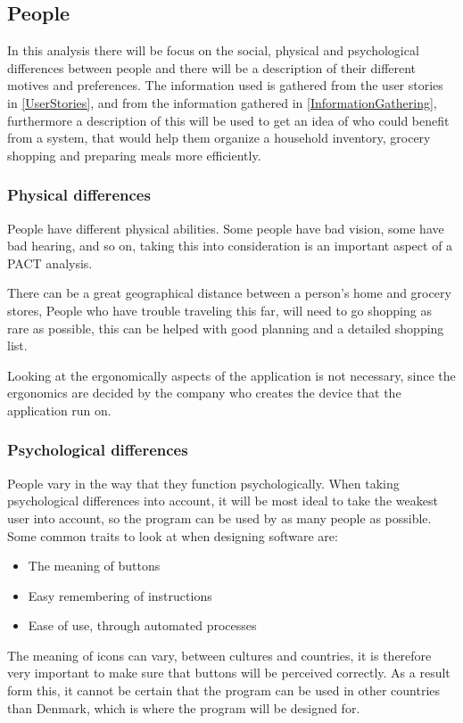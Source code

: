 \subsection{People} \label{PeoplePACT}
In this analysis there will be focus on the social, physical and psychological differences between people and there will be a description of their different motives and preferences. The information used is gathered from the user stories in \cref{UserStories}, and from the information gathered in \cref{InformationGathering}, furthermore a description of this will be used to get an idea of who could benefit from a system, that would help them organize a household inventory, grocery shopping and preparing meals more efficiently.

\subsubsection{Physical differences}
People have different physical abilities. Some people have bad vision, some have bad hearing, and so on, taking this into consideration is an important aspect of a PACT analysis.

There can be a great geographical distance between a person's home and grocery stores, People who have trouble traveling this far, will need to go shopping as rare as possible, this can be helped with good planning and a detailed shopping list.

Looking at the ergonomically aspects of the application is not necessary, since the ergonomics are decided by the company who creates the device that the application run on.

\subsubsection{Psychological differences}
People vary in the way that they function psychologically. When taking psychological differences into account, it will be most ideal to take the weakest user into account, so the program can be used by as many people as possible. Some common traits to look at when designing software are:
\begin{itemize}
    \item The meaning of buttons
    \item Easy remembering of instructions
    \item Ease of use, through automated processes
\end{itemize}
The meaning of icons can vary, between cultures and countries, it is therefore very important to make sure that buttons will be perceived correctly. As a result form this, it cannot be certain that the program can be used in other countries than Denmark, which is where the program will be designed for.

